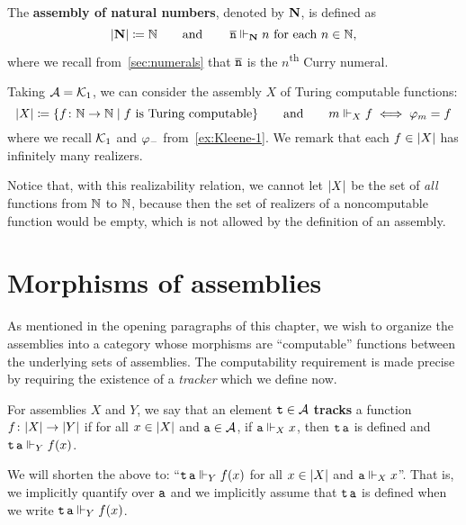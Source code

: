 \begin{example}\label{ex:NatAsm}
  The \textbf{assembly of natural numbers}, denoted by \(\mathbf N\), is defined as
  \[
    \lvert\mathbf N\rvert \coloneqq \mathbb N
    \quad\quad\text{and}\quad\quad
    \operatorname{\overline{\mathtt{n}}} \Vdash_\mathbf N n \text{ for each \(n \in \mathbb N\)},
  \]
  where we recall from~\cref{sec:numerals} that \(\operatorname{\overline{\mathtt{n}}}\) is the
  \(n\)\textsuperscript{th} Curry numeral.
\end{example}

\begin{example}
  Taking \(\mathcal A = \mathcal{K}_1\), we can consider the assembly \(X\) of Turing computable functions:
  \[
    \lvert X\rvert \coloneqq \{f \colon \mathbb N \to \mathbb N \mid f \text{ is Turing computable}\}
    \quad\quad\text{and}\quad\quad
    m \Vdash_X f \iff \varphi_{m} = f
  \]
  where we recall \(\mathcal{K}_1\) and \(\varphi_{-}\) from~\cref{ex:Kleene-1}.
  We remark that each \(f \in \lvert X\rvert\) has infinitely many realizers.

  Notice that, with this realizability relation, we cannot let \(\lvert X\rvert\)
  be the set of \emph{all} functions from \(\mathbb N\) to \(\mathbb N\), because then the
  set of realizers of a noncomputable function would be empty, which is not
  allowed by the definition of an assembly.
\end{example}

\section{Morphisms of assemblies}

As mentioned in the opening paragraphs of this chapter, we wish to organize the
assemblies into a category whose morphisms are ``computable'' functions between
the underlying sets of assemblies.
%
The computability requirement is made precise by requiring the existence of a
\emph{tracker} which we define now.

\begin{definition}[Track]
  For assemblies \(X\) and \(Y\), we say that an element \(\operatorname{\mathtt{t}} \in \mathcal A\)
  \textbf{tracks} a function \(f \colon \lvert X\rvert \to \lvert Y\rvert\) if for all
  \(x \in \lvert X\rvert\) and \(\operatorname{\mathtt{a}} \in \mathcal A\), if \(\operatorname{\mathtt{a}} \Vdash_X x\), then
  \(\operatorname{\mathtt{t}}\operatorname{\mathtt{a}}\) is defined and \(\operatorname{\mathtt{t}}\operatorname{\mathtt{a}} \Vdash_Y f(x)\).
\end{definition}

\begin{notation}
  We will shorten the above to: ``\(\operatorname{\mathtt{t}}\operatorname{\mathtt{a}} \Vdash_Y f(x)\)
  for all \(x \in \lvert X\rvert\) and \(\operatorname{\mathtt{a}} \Vdash_X x\)''.
  That is, we implicitly quantify over \(\operatorname{\mathtt{a}}\) and we implicitly assume that
  \(\operatorname{\mathtt{t}}\operatorname{\mathtt{a}}\) is defined when we write
  \(\operatorname{\mathtt{t}}\operatorname{\mathtt{a}} \Vdash_Y f(x)\).
\end{notation}

